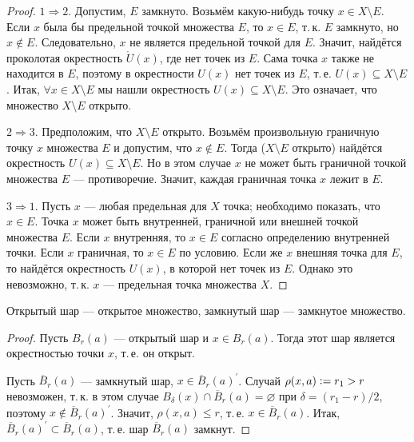 \begin{proof}
    $1 \Rightarrow 2$. Допустим, $E$ замкнуто. Возьмём какую-нибудь точку $x \in X \setminus E$. Если $x$ была бы предельной точкой множества $E$, то $x \in E$, т.\,к. $E$ замкнуто, но $x \notin E$. Следовательно, $x$ не является предельной точкой для $E$. Значит, найдётся проколотая окрестность $\mathring{U}(x)$, где нет точек из $E$. Сама точка $x$ также не находится в $E$, поэтому в окрестности $U(x)$ нет точек из $E$, т.\,е. $U(x) \subseteq X \setminus E$. Итак, $\forall x \in X \setminus E$ мы нашли окрестность $U(x) \subseteq X \setminus E$. Это означает, что множество $X \setminus E$ открыто.
    
    $2 \Rightarrow 3$. Предположим, что $X \setminus E$ открыто. Возьмём произвольную граничную точку $x$ множества $E$ и допустим, что $x \notin E$. Тогда ($X \setminus E$ открыто) найдётся окрестность $U(x) \subseteq X \setminus E$. Но в этом случае $x$ не может быть граничной точкой множества $E$ --- противоречие. Значит, каждая граничная точка $x$ лежит в $E$.
    
    $3 \Rightarrow 1$. Пусть $x$ --- любая предельная для $X$ точка; необходимо показать, что $x \in E$. Точка $x$ может быть внутренней, граничной или внешней точкой множества $E$. Если $x$ внутренняя, то $x \in E$ согласно определению внутренней точки. Если $x$ граничная, то $x \in E$ по условию. Если же $x$ внешняя точка для $E$, то найдётся окрестность $U(x)$, в которой нет точек из $E$. Однако это невозможно, т.\,к. $x$ --- предельная точка множества $X$.
\end{proof}

\begin{proposal}
    Открытый шар --- открытое множество, замкнутый шар --- замкнутое множество.
\end{proposal}

\begin{proof}
    Пусть $B_r(a)$ --- открытый шар и $x \in B_r(a)$. Тогда этот шар является окрестностью точки $x$, т.\,е. он открыт.

    Пусть $\overline{B}_r(a)$ --- замкнутый шар, $x \in \overline{B}_r(a)^\prime$. Случай $\rho(x, a) \vcentcolon = r_1 > r$ невозможен, т.\,к. в этом случае $B_\delta(x) \cap \overline{B}_r(a) = \varnothing$ при $\delta = (r_1 - r) / 2$, поэтому $x \notin \overline{B}_r(a)^\prime$. Значит, $\rho(x, a) \leqslant r$, т.\,е. $x \in \overline{B}_r(a)$. Итак, $\overline{B}_r(a)^\prime \subset \overline{B}_r(a)$, т.\,е. шар $\overline{B}_r(a)$ замкнут.
\end{proof}

